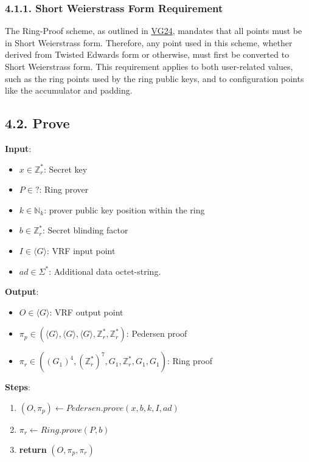 \documentclass[
]{article}
\providecommand{\tightlist}{%
  \setlength{\itemsep}{0pt}\setlength{\parskip}{0pt}}
\begin{document}
\hypertarget{short-weierstrass-form-requirement}{%
\subsubsection{4.1.1. Short Weierstrass Form
Requirement}\label{short-weierstrass-form-requirement}}

The Ring-Proof scheme, as outlined in
\href{https://github.com/davxy/ring-proof-spec}{VG24}, mandates that all
points must be in Short Weierstrass form. Therefore, any point used in
this scheme, whether derived from Twisted Edwards form or otherwise,
must first be converted to Short Weierstrass form. This requirement
applies to both user-related values, such as the ring points used by the
ring public keys, and to configuration points like the accumulator and
padding.

\hypertarget{prove-2}{%
\subsection{4.2. Prove}\label{prove-2}}

\textbf{Input}:

\begin{itemize}
\tightlist
\item
  \(x \in \mathbb{Z}^*_r\): Secret key
\item
  \(P \in ?\): Ring prover
\item
  \(k \in \mathbb{N}_k\): prover public key position within the ring
\item
  \(b \in \mathbb{Z}^*_r\): Secret blinding factor
\item
  \(I \in \langle G \rangle\): VRF input point
\item
  \(ad \in \Sigma^*\): Additional data octet-string.
\end{itemize}

\textbf{Output}:

\begin{itemize}
\tightlist
\item
  \(O \in \langle G \rangle\): VRF output point
\item
  \(\pi_p \in (\langle G \rangle, \langle G \rangle, \langle G \rangle, \mathbb{Z}^*_r, \mathbb{Z}^*_r)\):
  Pedersen proof
\item
  \(\pi_r \in ((G_1)^4, (\mathbb{Z}^*_r)^7, G_1, \mathbb{Z}^*_r, G_1, G_1)\):
  Ring proof
\end{itemize}

\textbf{Steps}:

\begin{enumerate}
\def\labelenumi{\arabic{enumi}.}
\tightlist
\item
  \((O, \pi_p) \leftarrow Pedersen.prove(x, b, k, I, ad)\)
\item
  \(\pi_r \leftarrow Ring.prove(P, b)\)
\item
  \textbf{return} \((O, \pi_p, \pi_r)\)
\end{enumerate}
\end{document}
